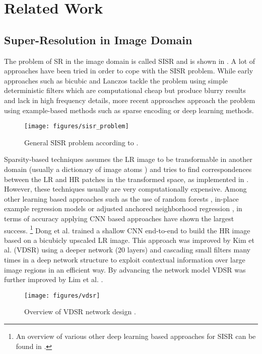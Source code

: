 \newpage
\section{Related Work}
\label{sec:RelatedWork}
\subsection{Super-Resolution in Image Domain}
The problem of SR in the image domain is called \ac{SISR} and is shown in
. A lot of approaches have been
tried in order to cope with the \ac{SISR} problem. While early approaches such as
bicubic and Lanczos \cite{LFIOATD} tackle the problem using simple deterministic
filters which are computational cheap but produce blurry results and lack in
high frequency details, more recent approaches approach the problem using
example-based methods such as sparse encoding or deep learning methods.

\begin{figure}[!htbp]
	\centering
	\texttt{[image: figures/sisr\_problem]}
	\caption{General SISR problem  according to \cite{DLFSISRABR}.}
  \label{fig:sisr_problem}
\end{figure}

Sparsity-based techniques assumes the \ac{LR} image to be transformable in another
domain (usually a dictionary of image atoms \cite{SARPFTTAISAIP}) and tries to
find correspondences between the \ac{LR} and \ac{HR} patches in the transformed space, as
implemented in \cite{IDASRBASDSAAR}. However, these techniques usually are
very computationally expensive. Among other learning based approaches such as
the use of random forests \cite{FAAIUWSRF}, in-place example regression models
\cite{FISRBOIPER} or adjusted anchored neighborhood regression \cite{AANRFFSR},
in terms of accuracy applying CNN based approaches have shown the largest success.
\footnote{An overview of various other deep learning based approaches for SISR
can be found in \cite{DLFSISRABR}.}
Dong et al. \cite{LADCNFISR} trained a shallow CNN end-to-end to build the HR
image based on a bicubicly upscaled LR image. This approach was improved by Kim
et al. \cite{AISRUVDCN} (VDSR) using a deeper network (20 layers) and cascading
small filters many times in a deep network structure to exploit contextual
information over large image regions in an efficient way. By advancing the
network model VDSR was further improved by Lim et al. \cite{EDRNFSISR}.

\begin{figure}[!htbp]
	\centering
	\texttt{[image: figures/vdsr]}
	\caption{Overview of VDSR network design \cite{AISRUVDCN}.}
  \label{fig:vdsr}
\end{figure}

